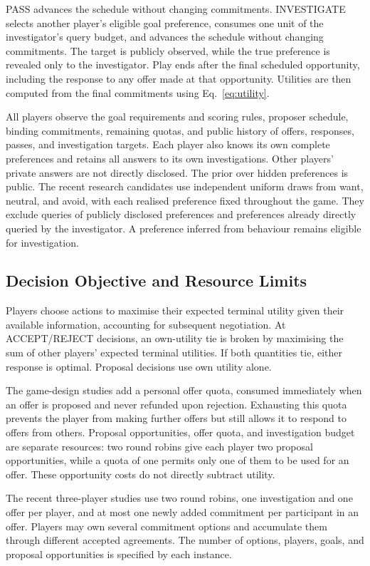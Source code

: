 \documentclass[11pt,a4paper]{article}
\begin{document}
PASS advances the schedule without changing commitments. INVESTIGATE
selects another player's eligible goal preference, consumes one unit of
the investigator's query budget, and advances the schedule without changing
commitments. The target is publicly observed, while the true preference
is revealed only to the investigator. Play ends after the final scheduled
opportunity, including the response to any offer made at that opportunity.
Utilities are then computed from the final commitments using
Eq.~\ref{eq:utility}.

All players observe the goal requirements and scoring rules, proposer
schedule, binding commitments, remaining quotas, and public history of
offers, responses, passes, and investigation targets. Each player also
knows its own complete preferences and retains all answers to its own
investigations. Other players' private answers are not directly disclosed.
The prior over hidden preferences is public. The recent research
candidates use independent uniform draws from want, neutral, and avoid,
with each realised preference fixed throughout the game. They exclude
queries of publicly disclosed preferences and preferences already directly
queried by the investigator. A preference inferred from behaviour remains
eligible for investigation.

\subsection{Decision Objective and Resource Limits}
Players choose actions to maximise their expected terminal utility given
their available information, accounting for subsequent negotiation. At
ACCEPT/REJECT decisions, an own-utility tie is broken by maximising the
sum of other players' expected terminal utilities. If both quantities tie,
either response is optimal. Proposal decisions use own utility alone.

The game-design studies add a personal offer quota, consumed immediately
when an offer is proposed and never refunded upon rejection. Exhausting
this quota prevents the player from making further offers but still allows
it to respond to offers from others. Proposal opportunities, offer quota,
and investigation budget are separate resources: two round robins give
each player two proposal opportunities, while a quota of one permits
only one of them to be used for an offer. These opportunity costs do not
directly subtract utility.

The recent three-player studies use two round robins, one investigation
and one offer per player, and at most one newly added commitment per
participant in an offer. Players may own several commitment options and
accumulate them through different accepted agreements. The number of
options, players, goals, and proposal opportunities is specified by each
instance.
\end{document}
